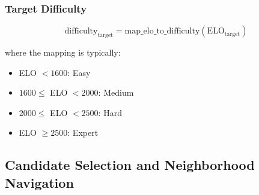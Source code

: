 \documentclass[sigconf,authordraft,twoside]{acmart}
\begin{document}
\subsubsection{Target Difficulty}
\begin{equation}
\text{difficulty}_{\text{target}} = \text{map\_elo\_to\_difficulty}(\text{ELO}_{\text{target}})
\end{equation}

where the mapping is typically:
\begin{itemize}
\item ELO $< 1600$: Easy
\item $1600 \le$ ELO $< 2000$: Medium
\item $2000 \le$ ELO $< 2500$: Hard
\item ELO $\geq 2500$: Expert
\end{itemize}

\subsection{Candidate Selection and Neighborhood Navigation}
\end{document}
